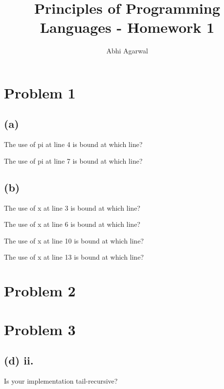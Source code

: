 \documentclass[11pt, oneside]{article}
\title{Principles of Programming Languages - Homework 1}
\author{Abhi Agarwal}
\date{}
\newcommand{\forceindent}{\leavevmode{\parindent=1.5em\indent}}
\begin{document}
\maketitle
\section{Problem 1}

\subsection*{(a)}
\forceindent The use of pi at line 4 is bound at which line?
\par The use of pi at line 7 is bound at which line?

\subsection*{(b)}
\forceindent The use of x at line 3 is bound at which line?
\par The use of x at line 6 is bound at which line?
\par The use of x at line 10 is bound at which line?
\par The use of x at line 13 is bound at which line?

\section{Problem 2}
\par

\section{Problem 3}

\subsection*{(d) ii.}

\forceindent Is your implementation tail-recursive?
\end{document}
